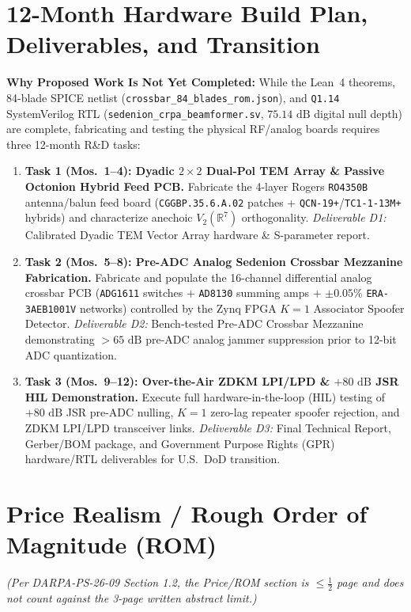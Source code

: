 \documentclass[12pt,letterpaper]{article}
\begin{document}
\section{12-Month Hardware Build Plan, Deliverables, and Transition}
\textbf{Why Proposed Work Is Not Yet Completed:} While the Lean~4 theorems, 84-blade SPICE netlist (\texttt{crossbar\_84\_blades\_rom.json}), and \texttt{Q1.14} SystemVerilog RTL (\texttt{sedenion\_crpa\_beamformer.sv}, $75.14\text{ dB}$ digital null depth) are complete, fabricating and testing the physical RF/analog boards requires three 12-month R\&D tasks:
\begin{enumerate}[leftmargin=16pt,itemsep=1pt,topsep=1pt]
    \item \textbf{Task 1 (Mos.\ 1--4): Dyadic $2\times 2$ Dual-Pol TEM Array \& Passive Octonion Hybrid Feed PCB.} Fabricate the 4-layer Rogers \texttt{RO4350B} antenna/balun feed board (\texttt{CGGBP.35.6.A.02} patches + \texttt{QCN-19+}/\texttt{TC1-1-13M+} hybrids) and characterize anechoic $V_2(\mathbb{R}^7)$ orthogonality. \textit{Deliverable D1:} Calibrated Dyadic TEM Vector Array hardware \& S-parameter report.
    \item \textbf{Task 2 (Mos.\ 5--8): Pre-ADC Analog Sedenion Crossbar Mezzanine Fabrication.} Fabricate and populate the 16-channel differential analog crossbar PCB (\texttt{ADG1611} switches + \texttt{AD8130} summing amps + $\pm 0.05\%$ \texttt{ERA-3AEB1001V} networks) controlled by the Zynq FPGA $K=1$ Associator Spoofer Detector. \textit{Deliverable D2:} Bench-tested Pre-ADC Crossbar Mezzanine demonstrating $>65\text{ dB}$ pre-ADC analog jammer suppression prior to 12-bit ADC quantization.
    \item \textbf{Task 3 (Mos.\ 9--12): Over-the-Air ZDKM LPI/LPD \& $+80\text{ dB}$ JSR HIL Demonstration.} Execute full hardware-in-the-loop (HIL) testing of $+80\text{ dB}$ JSR pre-ADC nulling, $K=1$ zero-lag repeater spoofer rejection, and ZDKM LPI/LPD transceiver links. \textit{Deliverable D3:} Final Technical Report, Gerber/BOM package, and Government Purpose Rights (GPR) hardware/RTL deliverables for U.S.\ DoD transition.
\end{enumerate}

\newpage
\thispagestyle{empty}
\section*{Price Realism / Rough Order of Magnitude (ROM)}
\textit{(Per DARPA-PS-26-09 Section 1.2, the Price/ROM section is $\le \frac{1}{2}$ page and does not count against the 3-page written abstract limit.)}
\end{document}
